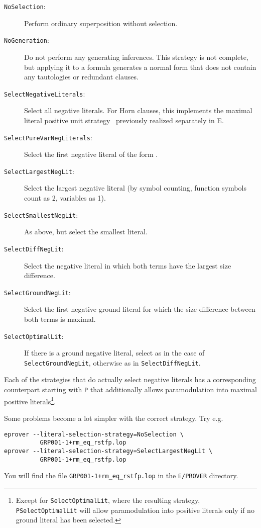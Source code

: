 \documentclass{report}
\begin{document}
\begin{description}
\item[\texttt{NoSelection}:]
 Perform ordinary superposition without selection.
\item[\texttt{NoGeneration}:] Do not perform any generating
  inferences. This strategy is not complete, but applying it to a
  formula generates a normal form that does not contain any
  tautologies or redundant clauses.
\item[\texttt{SelectNegativeLiterals}:] Select all negative literals. For Horn
  clauses, this implements the maximal literal positive unit
  strategy~\cite{Dershowitz:IJCAI-91} previously realized separately in
  E.
\item[\texttt{SelectPureVarNegLiterals}:] Select the first negative literal of
  the form .
\item[\texttt{SelectLargestNegLit}:] Select the largest negative literal (by
  symbol counting, function symbols count as 2, variables as 1).
\item[\texttt{SelectSmallestNegLit}:] As above, but select the smallest
  literal.
\item[\texttt{SelectDiffNegLit}:] Select the negative literal in which both
  terms have the largest size difference.
\item[\texttt{SelectGroundNegLit}:] Select the first negative ground literal
  for which the size difference between both terms is maximal.
\item[\texttt{SelectOptimalLit}:] If there is a ground negative literal, select
  as in the case of \texttt{SelectGroundNegLit}, otherwise as in
  \texttt{SelectDiffNegLit}.
\end{description}

Each of the strategies that do actually select negative literals has a
corresponding counterpart starting with \texttt{P} that additionally
allows paramodulation into maximal positive literals\footnote{Except
  for \texttt{SelectOptimalLit}, where the resulting strategy,
  \texttt{PSelectOptimalLit} will allow paramodulation into positive
  literals only if no ground literal has been selected.}.


\begin{example}
  Some problems become a lot simpler with the correct
  strategy. Try e.g.
\begin{verbatim}
eprover --literal-selection-strategy=NoSelection \
          GRP001-1+rm_eq_rstfp.lop
eprover --literal-selection-strategy=SelectLargestNegLit \
          GRP001-1+rm_eq_rstfp.lop
\end{verbatim}
  You will find the file \texttt{GRP001-1+rm\_eq\_rstfp.lop} in the
  \texttt{E/PROVER} directory.
\end{example}
\end{document}
